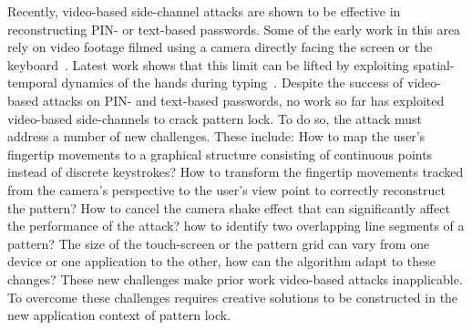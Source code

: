 Recently, video-based side-channel attacks are shown to be effective in reconstructing PIN- or
text-based passwords. Some of the early work in this area rely on video
footage filmed using a camera directly facing the screen or the keyboard~\cite{
kuhn2002compromising, balzarotti2008clearshot}. Latest work shows that
this limit can be lifted by exploiting spatial-temporal dynamics of
the hands during typing~\cite{shukla2014beware}.
Despite the success of
video-based attacks on PIN- and text-based passwords, no work so far has
exploited video-based side-channels to crack pattern lock.
To do so, the attack must address a number of new challenges. These include: How to map the user's fingertip
movements to a graphical structure consisting of continuous points instead of discrete
keystrokes? How to transform the fingertip movements tracked from
the camera's perspective to the user's view point to correctly reconstruct the
pattern? How to cancel the camera shake effect that can significantly
affect the performance of the attack? how to identify two overlapping line segments
of a pattern? The size of the touch-screen or the pattern grid
can vary from one device or one application to the other, how can the algorithm
adapt to these changes?
These new challenges make prior work video-based attacks inapplicable.
To overcome these challenges requires creative
solutions to be constructed in the new application context of pattern lock.



